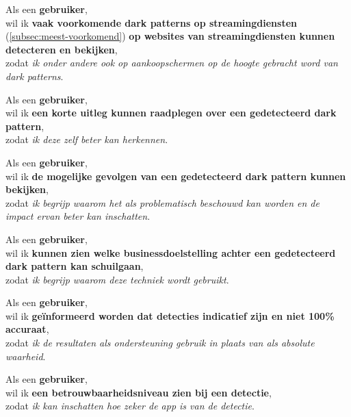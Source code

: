 \vspace{1em}

Als een \textbf{gebruiker}, \\
wil ik \textbf{vaak voorkomende dark patterns op streamingdiensten} (\ref{subsec:meest-voorkomend}) \textbf{op websites van streamingdiensten kunnen detecteren en bekijken}, \\
zodat \textit{ik onder andere ook op aankoopschermen op de hoogte gebracht word van dark patterns}.

\vspace{1em}

Als een \textbf{gebruiker}, \\
wil ik \textbf{een korte uitleg kunnen raadplegen over een gedetecteerd dark pattern}, \\
zodat \textit{ik deze zelf beter kan herkennen}.

\vspace{1em}

Als een \textbf{gebruiker}, \\
wil ik \textbf{de mogelijke gevolgen van een gedetecteerd dark pattern kunnen bekijken}, \\
zodat \textit{ik begrijp waarom het als problematisch beschouwd kan worden en de impact ervan beter kan inschatten}.

\vspace{1em}

Als een \textbf{gebruiker}, \\
wil ik \textbf{kunnen zien welke businessdoelstelling achter een gedetecteerd dark pattern kan schuilgaan}, \\
zodat \textit{ik begrijp waarom deze techniek wordt gebruikt}.

\vspace{1em}

Als een \textbf{gebruiker}, \\
wil ik \textbf{geïnformeerd worden dat detecties indicatief zijn en niet 100\% accuraat}, \\
zodat \textit{ik de resultaten als ondersteuning gebruik in plaats van als absolute waarheid}.

\vspace{1em}

Als een \textbf{gebruiker}, \\
wil ik \textbf{een betrouwbaarheidsniveau zien bij een detectie}, \\
zodat \textit{ik kan inschatten hoe zeker de app is van de detectie}.

